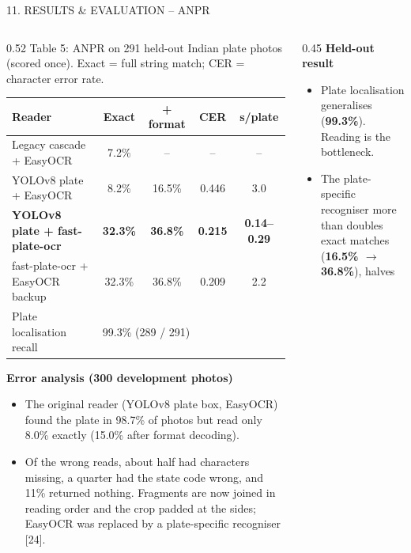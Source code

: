 \documentclass[aspectratio=169,10pt,t]{beamer}
\newcommand{\hd}[1]{{\color{dsblue}\textbf{#1}}}          %
\begin{document}
\begin{frame}{11. RESULTS \& EVALUATION -- ANPR}
\begin{columns}[T,onlytextwidth]
\begin{column}{0.52\textwidth}
\centering
{\tiny Table 5: ANPR on 291 held-out Indian plate photos (scored once). Exact = full string match; CER = character
error rate.}\\[0.2em]
\scriptsize
\setlength{\tabcolsep}{2.4pt}
\begin{tabular}{@{}lcccc@{}}
\toprule
\textbf{Reader} & \textbf{Exact} & \textbf{+ format} & \textbf{CER} & \textbf{s/plate}\\
\midrule
Legacy cascade + EasyOCR & 7.2\% & -- & -- & --\\
YOLOv8 plate + EasyOCR & 8.2\% & 16.5\% & 0.446 & 3.0\\
\textbf{YOLOv8 plate + fast-plate-ocr} & \textbf{32.3\%} & \textbf{36.8\%} & \textbf{0.215} & \textbf{0.14--0.29}\\
fast-plate-ocr + EasyOCR backup & 32.3\% & 36.8\% & 0.209 & 2.2\\
\midrule
Plate localisation recall & \multicolumn{4}{l}{99.3\% (289 / 291)}\\
\bottomrule
\end{tabular}
\vspace{0.5em}
\raggedright
\hd{\small Error analysis (300 development photos)}
\begin{itemize}\setlength{\itemsep}{0.1em}
  \item The original reader (YOLOv8 plate box, EasyOCR) found the plate in 98.7\% of photos but read only 8.0\%
        exactly (15.0\% after format decoding).
  \item Of the wrong reads, about half had characters missing, a quarter had the state code wrong, and 11\% returned
        nothing. Fragments are now joined in reading order and the crop padded at the sides; EasyOCR was replaced by a
        plate-specific recogniser [24].
\end{itemize}
\end{column}
\begin{column}{0.45\textwidth}
\hd{\small Held-out result}
\scriptsize
\begin{itemize}\setlength{\itemsep}{0.2em}
  \item Plate localisation generalises (\textbf{99.3\%}). Reading is the bottleneck.
  \item The plate-specific recogniser more than doubles exact matches (\textbf{16.5\% $\rightarrow$ 36.8\%}), halves

\end{itemize}
\end{column}
\end{columns}
\end{frame}
\end{document}
